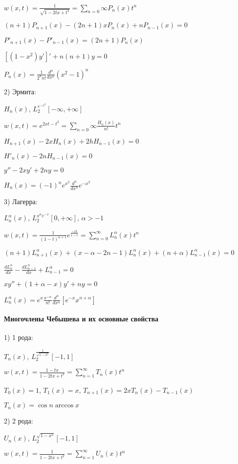 \documentclass[russian,twocolumn]{article}
\begin{document}
$w(x,t)=\frac{1}{\sqrt{1 - 2 t x + t^2}} = \sum_{n=0}{\infty}P_n(x)t^n$

$(n+1)P_{n+1}(x) - (2n+1)xP_{n}(x) + n P_{n-1}(x) = 0$

$P'_{n+1}(x) - P'_{n-1}(x)= (2n+1)P_n(x)$

$[(1 -x^2)y']' + n(n+1) y= 0$

$P_n(x) = \frac{1}{2^n n!}\frac{d^n}{dx^n}(x^2 -1 )^n$

2) Эрмита:

$H_n(x)$, $L_2^{e^{-x^2}}[-\infty, +\infty]$

$w(x,t) = e^{2xt-t^2} = \sum_{n=0}{\infty}\frac{H_n(x)}{n!}t^n$

$H_{n+1}(x) - 2xH_n(x) + 2h H_{n-1}(x) = 0$

$H'_n(x)-2nH_{n-1}(x) = 0$

$y'' - 2x y' + 2 n y = 0$

$H_n(x) = (-1)^n e^{x^2} \frac{d^n}{d x^n} e^{-x^2}$

3) Лагерра:

$L_n^\alpha(x)$, $L_2^{x^\alpha e^{-x}}[0,+\infty]$, $\alpha > -1$

$w(x,t) = \frac{1}{(1-t)^{\alpha + 1}}e^{\frac{-xt}{1-t}}=\sum_{n=0}^\infty L_n^\alpha (x) t^n$

$(n+1)L_{n+1}^\alpha (x) + (x-\alpha - 2n -1)L_n^\alpha(x) + (n+\alpha)L_{n-1}^\alpha(x) = 0$

$\frac{d L_n^\alpha}{dx} - \frac{dL_{n-1}^\alpha}{dx} + L_{n-1}^\alpha = 0$

$x y'' + (1 + \alpha - x) y' + n y = 0$

$L_n^\alpha(x) = e^x \frac{x^{-\alpha}}{n!}\frac{d^n}{d x ^n}[e^{-x}x^{n+\alpha}]$

\paragraph{Многочлены Чебышева и их основные свойства}

1) 1 рода: 

$T_n(x)$, $L_2^{\frac{1}{\sqrt{1-x^2}}}[-1,1]$

$w(x,t) = \frac{1-tx}{1 - 2tx + t^2} = \sum_{n=1}^\infty T_n(x)t^n$

$T_0(x) = 1$, $T_1(x) = x$, $T_{n+1}(x) = 2xT_n(x) - T_{n-1}(x)$

$T_n(x) = \cos n \arccos x$

2) 2 рода:

$U_n(x)$, $L_2^{\sqrt{1-x^2}}[-1,1]$

$w(x,t) = \frac{1}{1 - 2tx + t^2} = \sum_{n=1}^\infty U_n(x)t^n$
\end{document}
